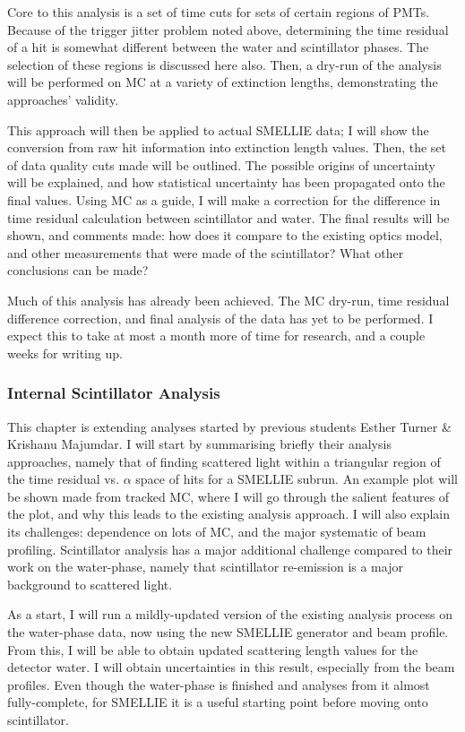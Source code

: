 Core to this analysis is a set of time cuts for sets of certain regions of PMTs. Because of the trigger jitter problem noted above, determining the time residual of a hit is somewhat different between the water and scintillator phases. The selection of these regions is discussed here also. Then, a dry-run of the analysis will be performed on MC at a variety of extinction lengths, demonstrating the approaches' validity.

This approach will then be applied to actual SMELLIE data; I will show the conversion from raw hit information into extinction length values. Then, the set of data quality cuts made will be outlined. The possible origins of uncertainty will be explained, and how statistical uncertainty has been propagated onto the final values. Using MC as a guide, I will make a correction for the difference in time residual calculation between scintillator and water. The final results will be shown, and comments made: how does it compare to the existing optics model, and other measurements that were made of the scintillator? What other conclusions can be made?

Much of this analysis has already been achieved. The MC dry-run, time residual difference correction, and final analysis of the data has yet to be performed. I expect this to take at most a month more of time for research, and a couple weeks for writing up.

\subsubsection{Internal Scintillator Analysis}
This chapter is extending analyses started by previous students Esther Turner \& Krishanu Majumdar. I will start by summarising briefly their analysis approaches, namely that of finding scattered light within a triangular region of the time residual vs. $\alpha$ space of hits for a SMELLIE subrun. An example plot will be shown made from tracked MC, where I will go through the salient features of the plot, and why this leads to the existing analysis approach. I will also explain its challenges: dependence on lots of MC, and the major systematic of beam profiling. Scintillator analysis has a major additional challenge compared to their work on the water-phase, namely that scintillator re-emission is a major background to scattered light.

As a start, I will run a mildly-updated version of the existing analysis process on the water-phase data, now using the new SMELLIE generator and beam profile. From this, I will be able to obtain updated scattering length values for the detector water. I will obtain uncertainties in this result, especially from the beam profiles. Even though the water-phase is finished and analyses from it almost fully-complete, for SMELLIE it is a useful starting point before moving onto scintillator.

